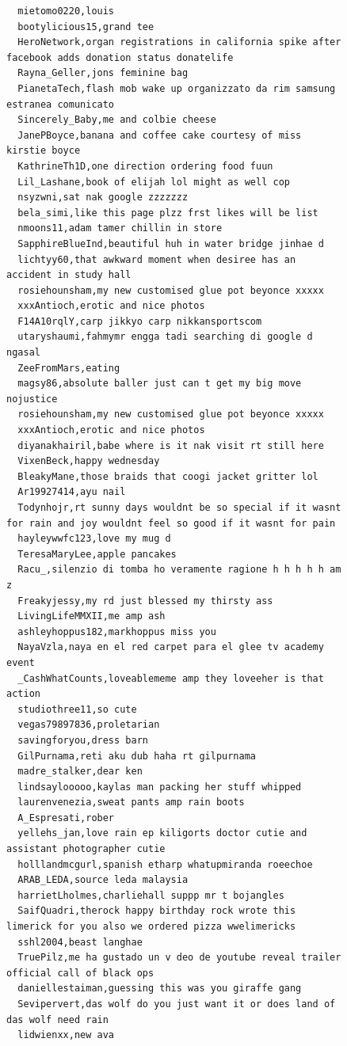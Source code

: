 \begin{figure}[htpb]
\begin{verbatim}
  mietomo0220,louis
  bootylicious15,grand tee
  HeroNetwork,organ registrations in california spike after facebook adds donation status donatelife
  Rayna_Geller,jons feminine bag
  PianetaTech,flash mob wake up organizzato da rim samsung estranea comunicato
  Sincerely_Baby,me and colbie cheese
  JanePBoyce,banana and coffee cake courtesy of miss kirstie boyce
  KathrineTh1D,one direction ordering food fuun
  Lil_Lashane,book of elijah lol might as well cop
  nsyzwni,sat nak google zzzzzzz
  bela_simi,like this page plzz frst likes will be list
  nmoons11,adam tamer chillin in store
  SapphireBlueInd,beautiful huh in water bridge jinhae d
  lichtyy60,that awkward moment when desiree has an accident in study hall
  rosiehounsham,my new customised glue pot beyonce xxxxx
  xxxAntioch,erotic and nice photos
  F14A10rqlY,carp jikkyo carp nikkansportscom
  utaryshaumi,fahmymr engga tadi searching di google d ngasal
  ZeeFromMars,eating
  magsy86,absolute baller just can t get my big move nojustice
  rosiehounsham,my new customised glue pot beyonce xxxxx
  xxxAntioch,erotic and nice photos
  diyanakhairil,babe where is it nak visit rt still here
  VixenBeck,happy wednesday
  BleakyMane,those braids that coogi jacket gritter lol
  Ar19927414,ayu nail
  Todynhojr,rt sunny days wouldnt be so special if it wasnt for rain and joy wouldnt feel so good if it wasnt for pain
  hayleywwfc123,love my mug d
  TeresaMaryLee,apple pancakes
  Racu_,silenzio di tomba ho veramente ragione h h h h h am z
  Freakyjessy,my rd just blessed my thirsty ass
  LivingLifeMMXII,me amp ash
  ashleyhoppus182,markhoppus miss you
  NayaVzla,naya en el red carpet para el glee tv academy event
  _CashWhatCounts,loveablememe amp they loveeher is that action
  studiothree11,so cute
  vegas79897836,proletarian
  savingforyou,dress barn
  GilPurnama,reti aku dub haha rt gilpurnama
  madre_stalker,dear ken
  lindsaylooooo,kaylas man packing her stuff whipped
  laurenvenezia,sweat pants amp rain boots
  A_Espresati,rober
  yellehs_jan,love rain ep kiligorts doctor cutie and assistant photographer cutie
  holllandmcgurl,spanish etharp whatupmiranda roeechoe
  ARAB_LEDA,source leda malaysia
  harrietLholmes,charliehall suppp mr t bojangles
  SaifQuadri,therock happy birthday rock wrote this limerick for you also we ordered pizza wwelimericks
  sshl2004,beast langhae
  TruePilz,me ha gustado un v deo de youtube reveal trailer official call of black ops
  daniellestaiman,guessing this was you giraffe gang
  Sevipervert,das wolf do you just want it or does land of das wolf need rain
  lidwienxx,new ava

\end{verbatim}
\end{figure}
